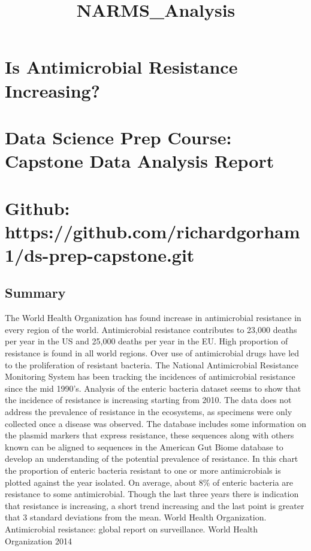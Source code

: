 \documentclass[11pt]{article}
\title{NARMS\_Analysis}
\begin{document}
    
    
    \maketitle
    
    

    
    \hypertarget{is-antimicrobial-resistance-increasing}{%
\section{Is Antimicrobial Resistance
Increasing?}\label{is-antimicrobial-resistance-increasing}}

\hypertarget{data-science-prep-course-capstone-data-analysis-report}{%
\section{Data Science Prep Course: Capstone Data Analysis
Report}\label{data-science-prep-course-capstone-data-analysis-report}}

\hypertarget{github-httpsgithub.comrichardgorham1ds-prep-capstone.git}{%
\section{Github:
https://github.com/richardgorham1/ds-prep-capstone.git}\label{github-httpsgithub.comrichardgorham1ds-prep-capstone.git}}

    \hypertarget{summary}{%
\subsection{Summary}\label{summary}}

The World Health Organization has found increase in antimicrobial
resistance in every region of the world. Antimicrobial resistance
contributes to 23,000 deaths per year in the US and 25,000 deaths per
year in the EU. High proportion of resistance is found in all world
regions. Over use of antimicrobial drugs have led to the proliferation
of resistant bacteria. The National Antimicrobial Resistance Monitoring
System has been tracking the incidences of antimicrobial resistance
since the mid 1990's. Analysis of the enteric bacteria dataset seems to
show that the incidence of resistance is increasing starting from 2010.
The data does not address the prevalence of resistance in the
ecosystems, as specimens were only collected once a disease was
observed. The database includes some information on the plasmid markers
that express resistance, these sequences along with others known can be
aligned to sequences in the American Gut Biome database to develop an
understanding of the potential prevalence of resistance. In this chart
the proportion of enteric bacteria resistant to one or more
antimicrobials is plotted against the year isolated. On average, about
8\% of enteric bacteria are resistance to some antimicrobial. Though the
last three years there is indication that resistance is increasing, a
short trend increasing and the last point is greater that 3 standard
deviations from the mean. World Health Organization. Antimicrobial
resistance: global report on surveillance. World Health Organization
2014
\end{document}
